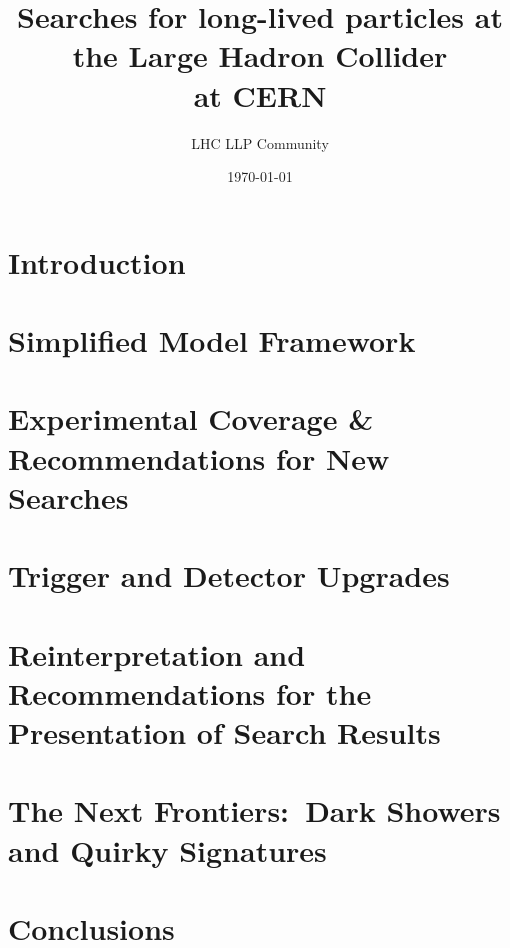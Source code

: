 \documentclass[a4paper,debug,notitlepage,nobib]{tufte-book}
\title{Searches for long-lived particles at the Large Hadron Collider \\ \smallskip \noindent at CERN}
\author{LHC LLP Community}
\date{\today}
\begin{document}
\setcounter{secnumdepth}{3} %



\setcounter{tocdepth}{1}
\tableofcontents
 

\chapter{Introduction}
\label{sec:Introduction}


\chapter{Simplified Model Framework}
\label{sec:simplifiedmodel}


\chapter{Experimental Coverage \& Recommendations for New Searches}
\label{sec:experimentcoverage}


\chapter{Trigger and Detector Upgrades}
\label{sec:triggers}


\chapter{Reinterpretation and Recommendations for the Presentation of Search Results}





 



\chapter{The Next Frontiers:~Dark Showers and Quirky Signatures}
\label{sec:showers}



\chapter{Conclusions}
\label{sec:conclusions}

 
\end{document}
